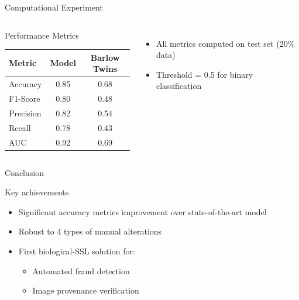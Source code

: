 \documentclass{beamer}
\begin{document}
\begin{frame}{Computational Experiment}
\begin{columns}[T]
    \vspace{-4mm}
    \begin{block}{Performance Metrics}
        \vspace{3mm}
        \centering
        \begin{tabular}{lcc}
        \hline
        Metric & Model & Barlow Twins \\ \hline
        Accuracy & \color{red}0.85 & 0.68 \\
        F1-Score & \color{red}0.80 & 0.48 \\
        Precision & \color{red}0.82 & 0.54 \\
        Recall & \color{red}0.78 & 0.43 \\ 
        AUC & \color{red}0.92 & 0.69 \\ \hline
        \end{tabular}
    \end{block}
    
    \begin{itemize}
        \footnotesize
        \item All metrics computed on test set (20\% data)
        \item Threshold = 0.5 for binary classification
    \end{itemize}
\end{columns}
\end{frame}


\begin{frame}{Conclusion}
\begin{block}{Key achievements}
    \begin{itemize}
        \item Significant accuracy metrics improvement over state-of-the-art model
        \item Robust to 4 types of manual alterations
        \item First biological-SSL solution for:
        \begin{itemize}
            \item Automated fraud detection
            \item Image provenance verification
        \end{itemize}
    \end{itemize}
\end{block}
\end{frame}
\end{document}
